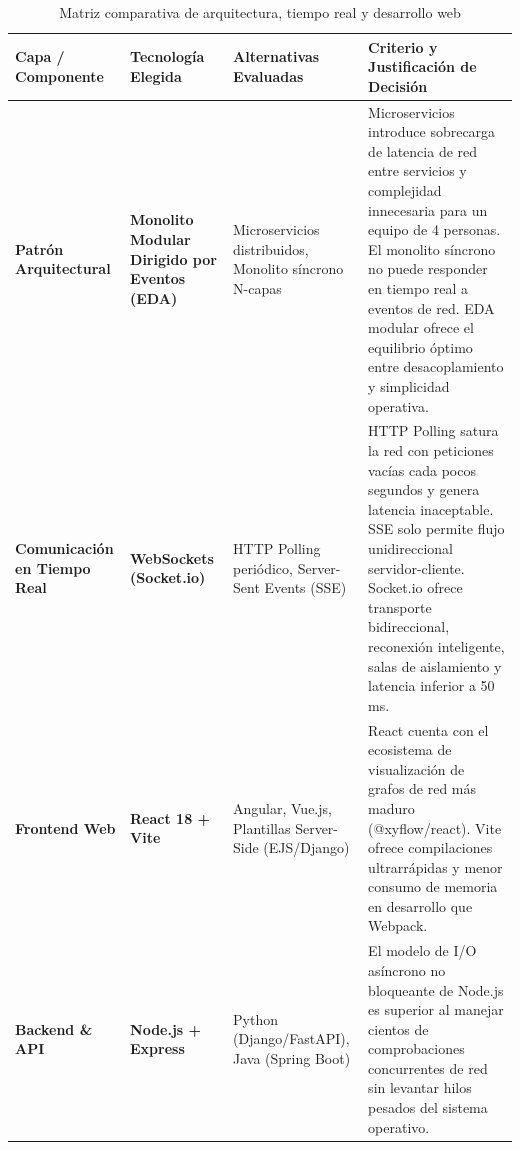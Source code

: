 \documentclass[12pt,a4paper]{report}
\begin{document}
\begin{table}[htbp]
\centering
\caption{Matriz comparativa de arquitectura, tiempo real y desarrollo web}\label{tab:comparativa_software}
\small
\begin{tabularx}{\textwidth}{p{2.6cm} p{2.8cm} p{3.8cm} X}
\toprule
\textbf{Capa / Componente} & \textbf{Tecnología Elegida} & \textbf{Alternativas Evaluadas} & \textbf{Criterio y Justificación de Decisión} \\
\midrule
\textbf{Patrón Arquitectural} & \textbf{Monolito Modular Dirigido por Eventos (EDA)} & Microservicios distribuidos, Monolito síncrono N-capas & Microservicios introduce sobrecarga de latencia de red entre servicios y complejidad innecesaria para un equipo de 4 personas. El monolito síncrono no puede responder en tiempo real a eventos de red. EDA modular ofrece el equilibrio óptimo entre desacoplamiento y simplicidad operativa. \\
\midrule
\textbf{Comunicación en Tiempo Real} & \textbf{WebSockets (Socket.io)} & HTTP Polling periódico, Server-Sent Events (SSE) & HTTP Polling satura la red con peticiones vacías cada pocos segundos y genera latencia inaceptable. SSE solo permite flujo unidireccional servidor-cliente. Socket.io ofrece transporte bidireccional, reconexión inteligente, salas de aislamiento y latencia inferior a 50 ms. \\
\midrule
\textbf{Frontend Web} & \textbf{React 18 + Vite} & Angular, Vue.js, Plantillas Server-Side (EJS/Django) & React cuenta con el ecosistema de visualización de grafos de red más maduro (@xyflow/react). Vite ofrece compilaciones ultrarrápidas y menor consumo de memoria en desarrollo que Webpack. \\
\midrule
\textbf{Backend \& API} & \textbf{Node.js + Express} & Python (Django/FastAPI), Java (Spring Boot) & El modelo de I/O asíncrono no bloqueante de Node.js es superior al manejar cientos de comprobaciones concurrentes de red sin levantar hilos pesados del sistema operativo. \\
\bottomrule
\end{tabularx}
\end{table}
\end{document}
